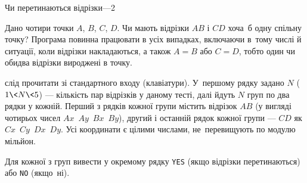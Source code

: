 ﻿\begin{problemAllDefault}{Чи перетинаються відрізки---2}

Дано чотири точки $A$, $B$, $C$, $D$. Чи мають відрізки $AB$ і $CD$ хоча~б одну спільну точку? Програма повинна працювати в усіх випадках, включаючи в~тому числі й ситуації, коли відрізки накладаються, а також $A=B$ або $C=D$, тобто один чи обидва відрізки вироджені в точку.

\InputFile 
слід прочитати зі стандартного входу (клавіатури). У~першому рядку задано $N$ ($1\<N\<5$) --- кількість пар відрізків у даному тесті, далі йдуть $N$ груп по два рядки у кожній. Перший з рядків кожної групи містить відрізок $AB$ (у вигляді чотирьох чисел $Ax$~$Ay$~$Bx$~$By$), другий і останній рядок кожної групи --- $CD$ як $Cx$~$Cy$~$Dx$~$Dy$. Усі координати є цілими числами, не~перевищують по модулю мільйон.

\OutputFile Для кожної з груп вивести у окремому рядку \texttt{YES} (якщо відрізки перетинаються) або \texttt{NO} (якщо~ні).

\Examples

\begin{example}
\end{example}

\end{problemAllDefault}
